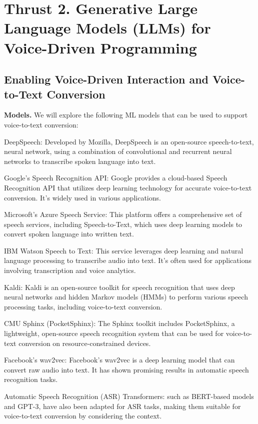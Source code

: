 \section{Thrust 2. Generative Large Language Models (LLMs) for Voice-Driven Programming}
\label{sec:thrust2}

\subsection{Enabling Voice-Driven Interaction and Voice-to-Text Conversion}

{\bf Models.} We will explore the following ML models that
can be used to support voice-to-text conversion:

DeepSpeech: Developed by Mozilla, DeepSpeech is an open-source
speech-to-text, neural network, using a combination of
convolutional and recurrent neural networks to transcribe spoken
language into text.

Google's Speech Recognition API: Google provides a cloud-based Speech Recognition API that utilizes deep learning technology for accurate voice-to-text conversion. It's widely used in various applications.

Microsoft's Azure Speech Service: This platform offers a comprehensive set of speech services, including Speech-to-Text, which uses deep learning models to convert spoken language into written text.

IBM Watson Speech to Text: This service leverages deep learning and natural language processing to transcribe audio into text. It's often used for applications involving transcription and voice analytics.

Kaldi: Kaldi is an open-source toolkit for speech recognition that uses deep neural networks and hidden Markov models (HMMs) to perform various speech processing tasks, including voice-to-text conversion.

CMU Sphinx (PocketSphinx): The Sphinx toolkit includes PocketSphinx, a lightweight, open-source speech recognition system that can be used for voice-to-text conversion on resource-constrained devices.

Facebook's wav2vec: Facebook's wav2vec is a deep learning model that can convert raw audio into text. It has shown promising results in automatic speech recognition tasks.

Automatic Speech Recognition (ASR) Transformers: such as BERT-based models and GPT-3, have also been adapted for ASR tasks, making them suitable for voice-to-text conversion by considering the context.

